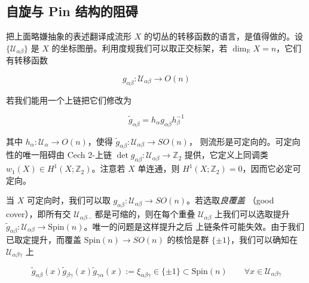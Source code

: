 \subsection{自旋与 Pin 结构的阻碍} %

把上面略嫌抽象的表述翻译成流形 $X$ 的切丛的转移函数的语言，是值得做的。设
$\{\mathcal{U}_{\alpha\beta}\}$ 是 $X$ 的坐标图册。利用度规我们可以取正交标架，若
$\dim_{\mathbb{R}}X=n$，它们有转移函数

\begin{equation}
  g_{\alpha\beta} : \mathcal{U}_{\alpha\beta} \to O(n)
  \tag{G.10}
  \label{eq:G.10}
\end{equation}

若我们能用一个上链把它们修改为

\begin{equation}
  \tilde{g}_{\alpha\beta} = h_\alpha g_{\alpha\beta} h_\beta^{-1}
  \tag{G.11}
  \label{eq:G.11}
\end{equation}

其中 $h_\alpha:\mathcal{U}_\alpha\to O(n)$，使得 $\tilde{g}_{\alpha\beta}:\mathcal{U}_{\alpha\beta}\to SO(n)$，
则流形是可定向的。可定向性的唯一阻碍由 Cech 2-上链
$\det g_{\alpha\beta}:\mathcal{U}_{\alpha\beta}\to\mathbb{Z}_2$ 提供，它定义上同调类
$w_1(X)\in H^1(X;\mathbb{Z}_2)$。注意若 $X$ 单连通，则 $H^1(X;\mathbb{Z}_2)=0$，因而它必定可定向。


当 $X$ 可定向时，我们可以取 $g_{\alpha\beta}:\mathcal{U}_{\alpha\beta}\to SO(n)$。若选取\emph{良覆盖}
（good cover），即所有交 $\mathcal{U}_{\alpha\beta\cdots}$ 都是可缩的，则在每个重叠
$\mathcal{U}_{\alpha\beta}$ 上我们可以选取提升
$\tilde{g}_{\alpha\beta}:\mathcal{U}_{\alpha\beta}\to\mathrm{Spin}(n)$。唯一的问题是这样提升之后
上链条件可能失效。由于我们已取定提升，而覆盖 $\mathrm{Spin}(n)\to SO(n)$ 的核恰是群
$\{\pm1\}$，我们可以确知在 $\mathcal{U}_{\alpha\beta\gamma}$ 上

\begin{equation}
  \tilde{g}_{\alpha\beta}(x)\tilde{g}_{\beta\gamma}(x)\tilde{g}_{\gamma\alpha}(x)
  := \xi_{\alpha\beta\gamma}\in\{\pm1\}\subset \mathrm{Spin}(n)
  \qquad \forall x\in\mathcal{U}_{\alpha\beta\gamma}
  \tag{G.12}
  \label{eq:G.12}
\end{equation}


